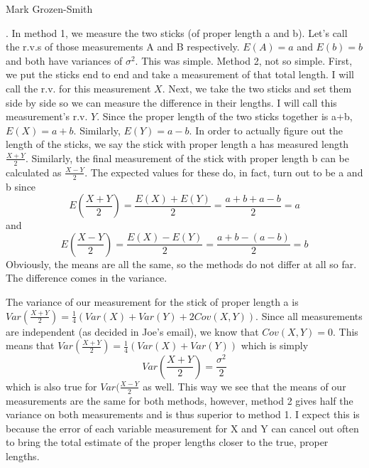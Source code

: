 \documentclass[11pt]{article}
\begin{document}
 \hfill Mark Grozen-Smith

\bigskip

. In method 1, we measure the two sticks (of proper length a and b).  Let's call the r.v.s of those measurements A and B respectively.  $E(A) = a$ and $E(b) = b$ and both have variances of $\sigma^2$.  This was simple.  Method 2, not so simple. 
First, we put the sticks end to end and take a measurement of that total length. I will call the r.v. for this measurement $X$.  Next, we take the two sticks and set them side by side so we can measure the difference in their lengths.  I will call this measurement's r.v. $Y$.  Since the proper length of the two sticks together is a+b, $E(X) = a + b$.  Similarly, $E(Y) = a-b$. In order to actually figure out the length of the sticks, we say the stick with proper length a has measured length $\frac{X+Y}{2}$. Similarly, the final measurement of the stick with proper length b can be calculated as $\frac{X-Y}{2}$.  The expected values for these do, in fact, turn out to be a and b since $$E(\frac{X+Y}{2}) = \frac{E(X)+E(Y)}{2} = \frac{a+b + a-b}{2} = a$$ and $$E(\frac{X-Y}{2}) = \frac{E(X)-E(Y)}{2} = \frac{a+b - (a-b)}{2} = b$$  Obviously, the means are all the same, so the methods do not differ at all so far.  The difference comes in the variance. 

The variance of our measurement for the stick of proper length a is $Var(\frac{X+Y}{2}) = \frac{1}{4}(Var(X)+Var(Y) + 2Cov(X,Y))$.  Since all measurements are independent (as decided in Joe's email), we know that $Cov(X,Y) = 0$.  This means that  $Var(\frac{X+Y}{2}) = \frac{1}{4}(Var(X)+Var(Y))$ which is simply $$Var(\frac{X+Y}{2}) = \frac{\sigma^2}{2}$$ which is also true for $Var(\frac{X-Y}{2}$ as well.  This way we see that the means of our measurements are the same for both methods, however, method 2 gives half the variance on both measurements and is thus superior to method 1.  I expect this is because the error of each variable measurement for X and Y can cancel out often to bring the total estimate of the proper lengths closer to the true, proper lengths. 

\bigskip
\end{document}
